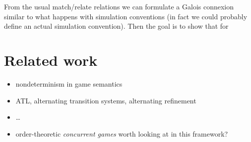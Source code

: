 \documentclass[format=sigplan,authordraft]{acmart}
\begin{document}
From the usual match/relate relations
we can formulate a Galois connexion
similar to what happens with simulation conventions
(in fact we could probably define an actual simulation convention).
Then the goal is to show that for 




\section{Related work} \label{sec:rw} %

\begin{itemize}
\item nondeterminism in game semantics
\item ATL, alternating transition systems, alternating refinement
\item \ldots
\item order-theoretic \emph{concurrent games} worth looking at
  in this framework?
\end{itemize}




\end{document}
